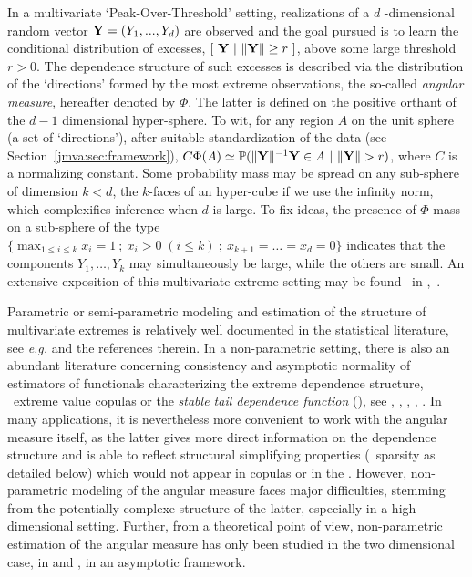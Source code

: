 In a multivariate `Peak-Over-Threshold' setting, realizations of a $d$ -dimensional random vector $\mathbf Y = (Y_1 ,..., Y_d)$ are observed and the goal pursued is to learn the conditional distribution of excesses, $\left[~ \mathbf Y ~|~ \|\mathbf Y\| \ge  r ~ \right]$, above some large threshold $ r>0$.
The dependence structure of such excesses is described via the
distribution of the ‘directions’ formed by the most extreme
observations, the  so-called \emph{angular measure}, hereafter denoted by $\Phi$.  The latter
is defined on the positive orthant of the $d-1$ dimensional
hyper-sphere. To wit, for any region $A$  on the unit sphere (a set
of `directions'), after suitable standardization of the data (see
 Section~\ref{jmva:sec:framework}), 
$C \Phi(A) \simeq \mathbb{P}(\|\mathbf Y\|^{-1} \mathbf Y \in A ~|~ \|\mathbf Y\| >r)$, where $C$ is a normalizing constant. 
Some probability mass may be spread on any sub-sphere of dimension $k
< d$, the $k$-faces of an hyper-cube if we use the infinity norm, which
complexifies inference when $d$ is large. To fix ideas, the presence of $\Phi$-mass on a
sub-sphere of the type $\{\max_{1\leq i\leq k} x_i = 1 ~;~   x_i >0 \;(i\le k) ~;~  x_{k+1} = \ldots = x_d = 0\}$ indicates that the components $Y_1,\ldots,Y_k$ may
simultaneously be large, while the others are small.
An extensive exposition of this multivariate extreme setting may be found \eg~in \cite{Resnick1987},~\cite{BGTS04}. 



Parametric or semi-parametric modeling and estimation of the structure of
multivariate extremes is relatively well documented in the statistical literature, see \emph{e.g.} \cite{coles1991modeling,fougeres2009models,cooley2010pairwise,sabourinNaveau2012}and the references therein. In a non-parametric setting, there is also an abundant literature concerning consistency and asymptotic normality of estimators of functionals characterizing the extreme dependence structure, \eg~extreme value copulas or the \emph{stable tail dependence function} (\stdf), see \cite{Segers12Bernoulli}, \cite{Drees98}, \cite{Embrechts2000}, \cite{Einmahl2012}, \cite{dHF06}. 
In many applications, it is nevertheless more convenient to work with the angular measure itself, as the latter gives more direct information on the dependence structure and is able to reflect structural simplifying properties (\eg~sparsity as detailed below) which would not appear in copulas or in the \stdf.
However, non-parametric modeling of the angular measure faces major difficulties, stemming from the potentially complexe structure of the latter, especially in a high dimensional setting.
Further, from a theoretical point of view, non-parametric estimation of the angular measure has only been studied in the two dimensional case, in \cite{Einmahl2001} and \cite{Einmahl2009}, in an asymptotic framework.

